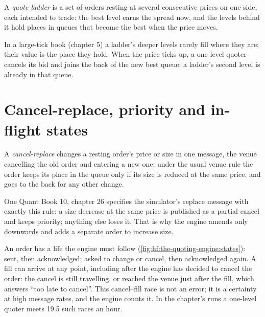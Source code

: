 \begin{definition}\label{def:hf:the-quoting-engine:ladder}
A \emph{quote ladder} is a set of orders resting at several consecutive prices on one side, each intended to trade: the best
level earns the spread now, and the levels behind it hold places in queues that become the best when the price moves.
\end{definition}

In a large-tick book (chapter 5) a ladder's deeper levels rarely fill where they are; their value is the place they hold. When the price ticks up,
a one-level quoter cancels its bid and joins the back of the new best queue; a ladder's second level is already in that queue.

\section{Cancel-replace, priority and in-flight states}

\begin{definition}\label{def:hf:the-quoting-engine:replace}
A \emph{cancel-replace} changes a resting order's price or size in one message, the venue cancelling the old order and entering
a new one; under the usual venue rule the order keeps its place in the queue only if its size is reduced at the same price, and goes to the back for
any other change.
\end{definition}

One Quant Book 10, chapter 26 specifies the simulator's replace message with exactly this rule: a size decrease at the same price is published as a
partial cancel and keeps priority; anything else loses it. That is why the engine amends only downwards and adds a separate order to increase size.

An order has a life the engine must follow (\cref{fig:hf:the-quoting-engine:states}): sent, then acknowledged; asked to change or cancel, then acknowledged again. A fill can arrive at any
point, including after the engine has decided to cancel the order: the cancel is still travelling, or reached the venue just after the fill, which
answers ``too late to cancel''. This cancel--fill race is not an error; it is a certainty at high message rates, and the engine counts it. In the
chapter's runs a one-level quoter meets 19.5 such races an hour.

